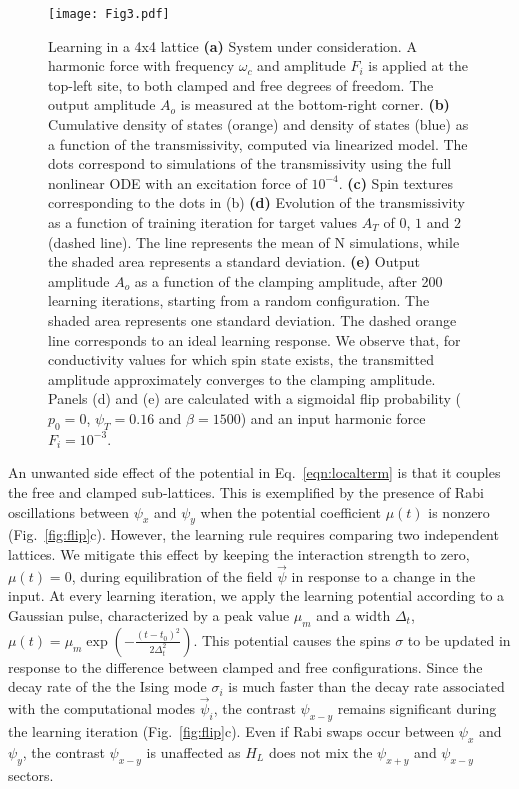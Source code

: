 \begin{figure}[t!]
\texttt{[image: Fig3.pdf]}
\caption{Learning in a 4x4 lattice \textbf{(a)} System under consideration. A harmonic force with frequency $\omega_c$ and amplitude $F_i$ is applied at the top-left site, to both clamped and free degrees of freedom. The output amplitude $A_o$ is measured at the bottom-right corner.  \textbf{(b)} Cumulative density of states (orange) and density of states (blue) as a function of the transmissivity, computed via linearized model. The dots correspond to simulations of the transmissivity  using the full nonlinear ODE with an excitation force of $10^{-4}$.  \textbf{(c)} Spin textures corresponding to the dots in (b) \textbf{(d)} Evolution of the transmissivity as a function of training iteration for target values $A_T$ of $0$, $1$ and $2$ (dashed line). The line represents the mean of N simulations, while the shaded area represents a standard deviation. \textbf{(e)} Output amplitude $A_o$ as a  function of the clamping amplitude, after 200 learning iterations, starting from a random configuration. The shaded area represents one standard deviation. The dashed orange line corresponds to an ideal learning response. We observe that, for conductivity values for which spin state exists, the transmitted amplitude approximately converges to the clamping amplitude. Panels (d) and (e) are calculated with a sigmoidal flip probability ($p_0=0$, $\psi_T=0.16$ and $\beta=1500$) and an input harmonic force $F_i=10^{-3}$.}
\label{fig:lattice} 
\vspace{-15  pt}
\end{figure}
An unwanted side effect of the potential in Eq.~\ref{eqn:localterm} is that it couples the free and clamped sub-lattices. This is exemplified by the presence of Rabi oscillations between $\psi_x$ and $\psi_y$ when the potential coefficient $\mu(t)$ is nonzero (Fig.~\ref{fig:flip}c). However, the learning rule requires comparing two independent lattices. We mitigate this effect by keeping the interaction strength to zero, $\mu(t)=0$, during equilibration of the field $\vec{\psi}$ in response to a change in the input. At every learning iteration, we apply the learning potential according to a Gaussian pulse, characterized by a peak value $\mu_m$ and a width $\Delta_t$, $\mu(t)=\mu_m \exp{\left(-\frac{(t-t_0)^2}{2\Delta_t^2}\right)}$. This potential causes the spins $\sigma$ to be updated in response to the difference between clamped and free configurations. Since the decay rate of the the Ising mode $\sigma_i$ is much faster than the decay rate associated with the computational modes $\vec{\psi}_i$, the contrast $\psi_{x-y}$ remains significant during the learning iteration (Fig.~\ref{fig:flip}c). Even if Rabi swaps occur between $\psi_x$ and $\psi_y$, the contrast $\psi_{x-y}$ is unaffected as $H_L$ does not mix the $\psi_{x+y}$ and $\psi_{x-y}$ sectors. 

